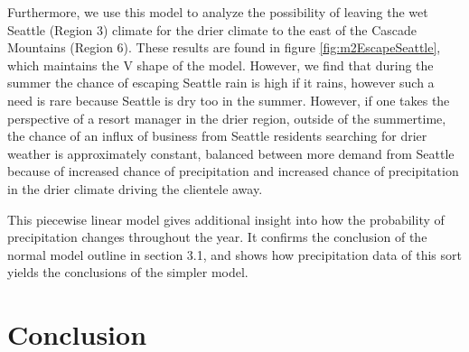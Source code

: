 \documentclass{article}
\begin{document}
Furthermore, we use this model to analyze the possibility of leaving the wet Seattle (Region 3) climate for the drier climate to the east of the Cascade Mountains (Region 6). These results are found in figure \ref{fig:m2EscapeSeattle}, which maintains the V shape of the model. However, we find that during the summer the chance of escaping Seattle rain is high if it rains, however such a need is rare because Seattle is dry too in the summer. 
However, if one takes the perspective of a resort manager in the drier region, outside of the summertime, the chance of an influx of business from Seattle residents searching for drier weather is approximately constant, balanced between more demand from Seattle because of increased chance of precipitation and increased chance of precipitation in the drier climate driving the clientele away.

This piecewise linear model gives additional insight into how the probability of precipitation changes throughout the year. It confirms the conclusion of the normal model outline in section 3.1, and shows how precipitation data of this sort yields the conclusions of the simpler model. 

\section{Conclusion}
\end{document}
